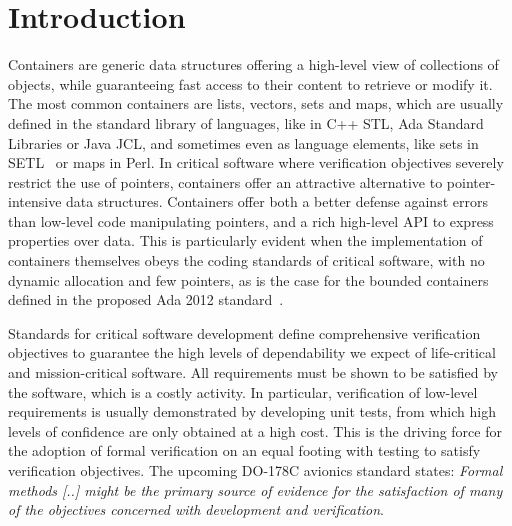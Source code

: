 \documentclass[runningheads,a4paper]{llncs}
\newcommand{\aftersec}{\vspace{-0.2cm}}
\begin{document}
\vspace{-0.5cm}
\section{Introduction}
\aftersec

Containers
are generic data structures offering a high-level
view of collections of objects, while guaranteeing fast access to their content
to retrieve or modify it. The most common containers are lists, vectors, sets
and maps, which are usually defined in the standard library of languages, like
in C++ STL, Ada Standard Libraries or Java JCL, and sometimes even as language
elements, like sets in SETL~\cite{schwartz:1986} or maps in Perl.
In critical software where
verification objectives severely restrict the use of pointers, containers offer
an attractive alternative to pointer-intensive data structures.
Containers offer both a better defense against errors than low-level code
manipulating pointers, and a rich high-level API to express properties over
data.
This is
particularly evident when the implementation of containers themselves obeys the
coding standards of critical software, with no dynamic allocation and few
pointers, as is the case for the bounded containers defined in the proposed Ada
2012 standard~\cite{ada2012}.

Standards for critical software development define comprehensive verification
objectives to guarantee the high levels of dependability we expect of
life-critical and mission-critical software. All requirements must be shown to
be satisfied by the software, which is a costly activity. In particular,
verification of low-level requirements is usually demonstrated by developing
unit tests, from which high levels of confidence are only obtained at a high
cost. This is the driving force for the adoption of formal verification on an
equal footing with testing to satisfy verification objectives. The upcoming
DO-178C avionics standard states: \textit{Formal methods [..] might
  be the primary source of evidence for the satisfaction of many of the
  objectives concerned with development and verification}.
\end{document}
